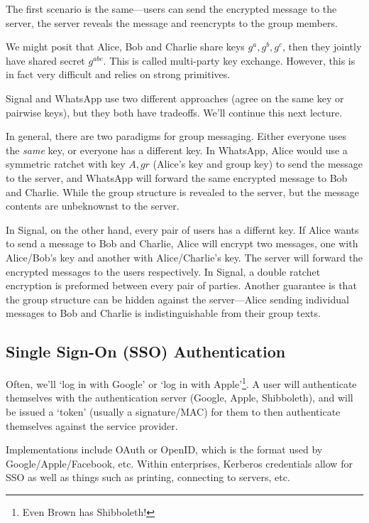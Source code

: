 The first scenario is the same---users can send the encrypted message to the server, the server reveals the message and reencrypts to the group members.

We might posit that Alice, Bob and Charlie share keys $g^a, g^b, g^c$, then they jointly have shared secret $g^{abc}$. This is called multi-party key exchange. However, this is in fact very difficult and relies on strong primitives.

Signal and WhatsApp use two different approaches (agree on the same key or pairwise keys), but they both have tradeoffs. We'll continue this next lecture.

In general, there are two paradigms for group messaging. Either everyone uses the \emph{same} key, or everyone has a different key. In WhatsApp, Alice would use a symmetric ratchet with key $A, gr$ (Alice's key and group key) to send the message to the server, and WhatsApp will forward the same encrypted message to Bob and Charlie. While the group structure is revealed to the server, but the message contents are unbeknownst to the server.


In Signal, on the other hand, every pair of users has a differnt key. If Alice wants to send a message to Bob and Charlie, Alice will encrypt two messages, one with Alice/Bob's key and another with Alice/Charlie's key. The server will forward the encrypted messages to the users respectively. In Signal, a double ratchet encryption is preformed between every pair of parties. Another guarantee is that the group structure can be hidden against the server---Alice sending individual messages to Bob and Charlie is indistinguishable from their group texts.



\subsection{Single Sign-On (SSO) Authentication}
Often, we'll `log in with Google' or `log in with Apple'\footnote{Even Brown has Shibboleth!}. A user will authenticate themselves with the authentication server (Google, Apple, Shibboleth), and will be issued a `token' (usually a signature/MAC) for them to then authenticate themselves against the service provider.

Implementations include OAuth or OpenID, which is the format used by Google/Apple/Facebook, etc. Within enterprises, Kerberos credentials allow for SSO as well as things such as printing, connecting to servers, etc.

